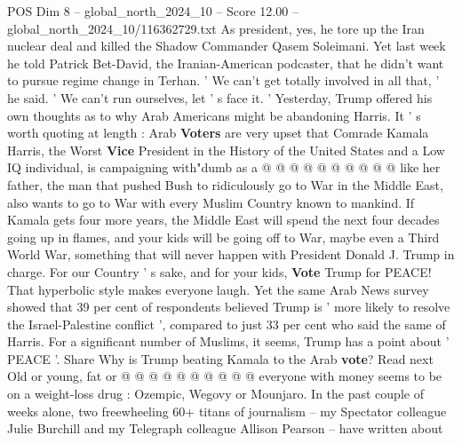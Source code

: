 \begin{textsample}{POS Dim 8 – global\_north\_2024\_10 – Score 12.00 – global\_north\_2024\_10/116362729.txt}
As president, yes, he tore up the Iran nuclear deal and killed the Shadow Commander Qasem Soleimani.
Yet last week he told Patrick Bet-David, the Iranian-American podcaster, that he didn't want to pursue regime change in Terhan. ' We can't get totally involved in all that, ' he said. ' We can't run ourselves, let ' s face it. ' Yesterday, Trump offered his own thoughts as to why Arab Americans might be abandoning Harris.
It ' s worth quoting at length : Arab \textbf{Voters} are very upset that Comrade Kamala Harris, the Worst \textbf{Vice} President in the History of the United States and a Low IQ individual, is campaigning with"dumb as a @ @ @ @ @ @ @ @ @ @ like her father, the man that pushed Bush to ridiculously go to War in the Middle East, also wants to go to War with every Muslim Country known to mankind.
If Kamala gets four more years, the Middle East will spend the next four decades going up in flames, and your kids will be going off to War, maybe even a Third World War, something that will never happen with President Donald J.
Trump in charge.
For our Country ' s sake, and for your kids, \textbf{Vote} Trump for PEACE!
That hyperbolic style makes everyone laugh.
Yet the same Arab News survey showed that 39 per cent of respondents believed Trump is ' more likely to resolve the Israel-Palestine conflict ', compared to just 33 per cent who said the same of Harris.
For a significant number of Muslims, it seems, Trump has a point about ' PEACE '.
Share Why is Trump beating Kamala to the Arab \textbf{vote}?
Read next Old or young, fat or @ @ @ @ @ @ @ @ @ @ everyone with money seems to be on a weight-loss drug : Ozempic, Wegovy or Mounjaro.
In the past couple of weeks alone, two freewheeling 60+ titans of journalism -- my Spectator colleague Julie Burchill and my Telegraph colleague Allison Pearson -- have written about

\end{textsample}
